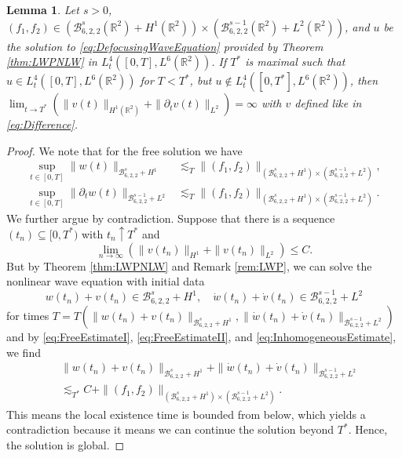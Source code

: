 \documentclass{amsart}
\newtheorem{lemma}[theorem]{Lemma}
\theoremstyle{definition}
\newcommand{\R}{\mathbb{R}}
\numberwithin{equation}{section}
\begin{document}
\begin{lemma}
\label{lem:BlowUpAlternative}
Let $s > 0$, $(f_1,f_2) \in (\mathcal{B}^{s}_{6,2,2}(\R^2) + H^{1}(\R^2)) \times (\mathcal{B}^{s-1}_{6,2,2}(\R^2) + L^2(\R^2))$, and $u$ be the solution to \eqref{eq:DefocusingWaveEquation} provided by Theorem \ref{thm:LWPNLW} in $L_t^4([0,T],L^6(\R^2))$. If $T^*$ is maximal such that $u \in L_t^4([0,T],L^6(\R^2))$ for $T < T^*$, but $u \notin L_t^4([0,T^{*}],L^6(\R^2))$, then $\lim_{t \to T^*} ( \| v(t) \|_{H^{1}(\R^2)} + \| \partial_t v(t) \|_{L^2} ) = \infty$ with $v$ defined like in \eqref{eq:Difference}.
\end{lemma}
\begin{proof}
We note that for the free solution we have
\begin{align}
\label{eq:FreeEstimateI}
\sup_{t \in [0,T]} \| w(t) \|_{\mathcal{B}^s_{6,2,2}+H^1} &\lesssim_T \| (f_{1},f_{2}) \|_{(\mathcal{B}^{s}_{6,2,2} + H^1) \times (\mathcal{B}^{s-1}_{6,2,2} + L^2)}, \\
\label{eq:FreeEstimateII}
\sup_{t \in [0,T]} \| \partial_t w(t) \|_{\mathcal{B}^{s-1}_{6,2,2}+L^2} &\lesssim_T \| (f_{1},f_{2}) \|_{(\mathcal{B}^{s}_{6,2,2} + H^1) \times (\mathcal{B}^{s-1}_{6,2,2} + L^2)}.
\end{align}
We further argue by contradiction. Suppose that there is a sequence $(t_n) \subseteq [0,T^*)$ with $t_n \uparrow T^*$ and
\begin{equation}
\label{eq:InhomogeneousEstimate}
\lim_{n \to \infty} ( \| v(t_n) \|_{H^1} + \| v(t_n) \|_{L^2} ) \leq C.
\end{equation}
But by Theorem \ref{thm:LWPNLW} and Remark \ref{rem:LWP}, we can solve the nonlinear wave equation with initial data
\begin{equation*}
w(t_n) + v(t_n) \in \mathcal{B}^s_{6,2,2} + H^1, \quad \dot{w}(t_n) + \dot{v}(t_n) \in \mathcal{B}^{s-1}_{6,2,2} + L^2
\end{equation*}
for times $T=T(\| w(t_n) + v(t_n) \|_{\mathcal{B}^s_{6,2,2} + H^1}, \| \dot{w}(t_n) + \dot{v}(t_n) \|_{\mathcal{B}^{s-1}_{6,2,2} + L^2})$ and by \eqref{eq:FreeEstimateI}, \eqref{eq:FreeEstimateII}, and \eqref{eq:InhomogeneousEstimate}, we find
\begin{equation*}
\begin{split}
\;&\| w(t_n) + v(t_n) \|_{\mathcal{B}^s_{6,2,2} + H^1} + \| \dot{w}(t_n) + \dot{v}(t_n) \|_{\mathcal{B}^{s-1}_{6,2,2} + L^2}\\
& \lesssim_{T^*} C + \| (f_{1},f_{2}) \|_{(\mathcal{B}^{s}_{6,2,2} + H^1) \times (\mathcal{B}^{s-1}_{6,2,2} + L^2)}.
\end{split}
\end{equation*}
This means the local existence time is bounded from below, which yields a contradiction because it means we can continue the solution beyond $T^*$. Hence, the solution is global.
\end{proof}
\end{document}
